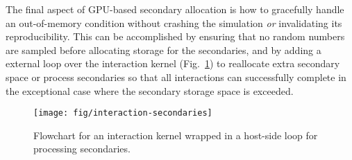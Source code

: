 The final aspect of GPU-based secondary allocation is how to gracefully
handle an out-of-memory condition without crashing the simulation
\emph{or} invalidating its reproducibility. This can be accomplished by
ensuring that no random numbers are sampled before allocating storage
for the secondaries, and by adding a external loop
over the interaction
kernel (Fig.~\ref{fig:interaction}) to reallocate extra secondary space or
process secondaries so
that all interactions can successfully complete in the exceptional case
where the secondary storage space is exceeded.

\begin{figure}[htb]
  \centering
  \texttt{[image: fig/interaction-secondaries]}
  \caption{Flowchart for an interaction kernel wrapped in a host-side loop for
  processing secondaries.}
  \label{fig:interaction}
\end{figure}
